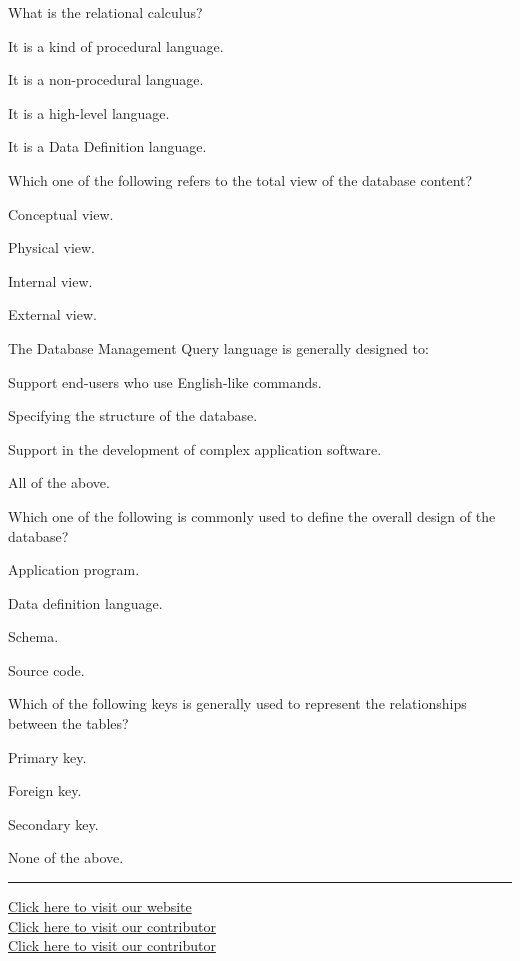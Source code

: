 \documentclass[11pt,a4paper]{article}
\begin{document}
\begin{parts}
  \item What is the relational calculus?
  
\begin{parts}
    \item It is a kind of procedural language.
    \item It is a non-procedural language.
    \item It is a high-level language.
    \item It is a Data Definition language.
  \end{parts}

  \item Which one of the following refers to the total view of the database content?
  
\begin{parts}
    \item Conceptual view.
    \item Physical view.
    \item Internal view.
    \item External view.
  \end{parts}

  \item The Database Management Query language is generally designed to:
  
\begin{parts}
    \item Support end-users who use English-like commands.
    \item Specifying the structure of the database.
    \item Support in the development of complex application software.
    \item All of the above.
  \end{parts}

  \item Which one of the following is commonly used to define the overall design of the database?
  
\begin{parts}
    \item Application program.
    \item Data definition language.
    \item Schema.
    \item Source code.
  \end{parts}

  \item Which of the following keys is generally used to represent the relationships between the tables?
  
\begin{parts}
    \item Primary key.
    \item Foreign key.
    \item Secondary key.
    \item None of the above.
  \end{parts}
\end{parts}

\vfill
\rule{\linewidth}{0.4pt}

\begin{center}\small
\href{https://bhu-exam.vercel.app/}{Click here to visit our website}\\[4pt]\href{https://me-aryan.vercel.app/}{Click here to visit our contributor}\\[4pt]\href{https://quashan-me.vercel.app/}{Click here to visit our contributor}
\end{center}
\end{document}
